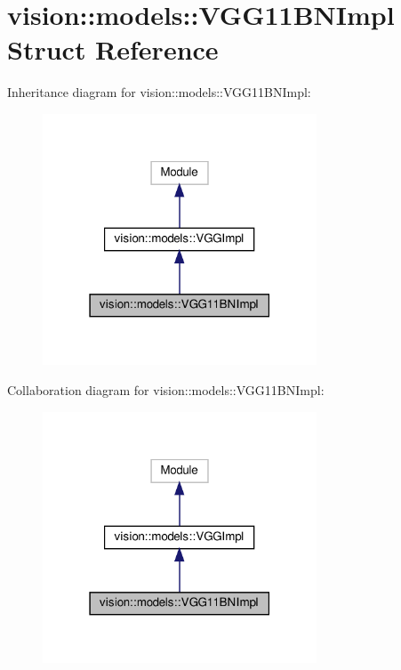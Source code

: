 \hypertarget{structvision_1_1models_1_1VGG11BNImpl}{}\section{vision\+:\+:models\+:\+:V\+G\+G11\+B\+N\+Impl Struct Reference}
\label{structvision_1_1models_1_1VGG11BNImpl}


Inheritance diagram for vision\+:\+:models\+:\+:V\+G\+G11\+B\+N\+Impl\+:
\nopagebreak
\begin{figure}[H]
\begin{center}
\leavevmode
\includegraphics[width=231pt]{structvision_1_1models_1_1VGG11BNImpl__inherit__graph}
\end{center}
\end{figure}


Collaboration diagram for vision\+:\+:models\+:\+:V\+G\+G11\+B\+N\+Impl\+:
\nopagebreak
\begin{figure}[H]
\begin{center}
\leavevmode
\includegraphics[width=231pt]{structvision_1_1models_1_1VGG11BNImpl__coll__graph}
\end{center}
\end{figure}
